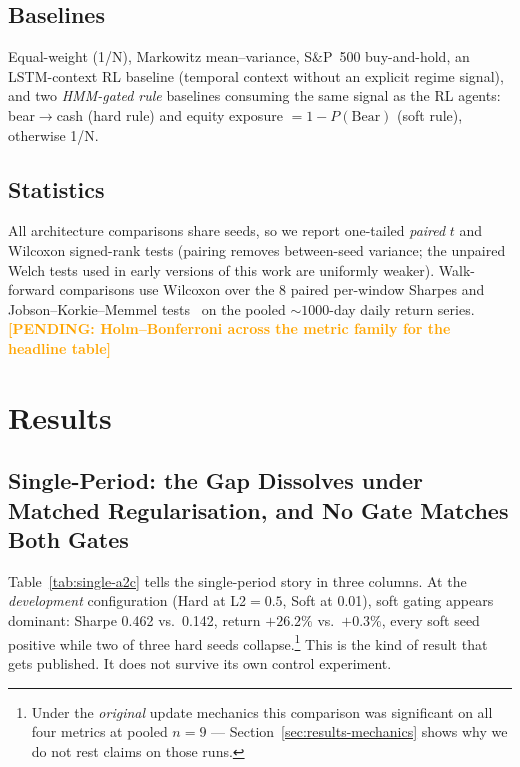 \documentclass[sigconf,anonymous,review]{acmart}
\newcommand{\pending}[1]{\textcolor{orange}{\textbf{[PENDING: #1]}}}
\begin{document}
\subsection{Baselines}
Equal-weight (1/N), Markowitz mean--variance, S\&P~500 buy-and-hold, an
LSTM-context RL baseline (temporal context without an explicit regime
signal), and two \emph{HMM-gated rule} baselines consuming the same
signal as the RL agents: bear$\rightarrow$cash (hard rule) and equity
exposure $=1-P(\mathrm{Bear})$ (soft rule), otherwise 1/N.

\subsection{Statistics}
All architecture comparisons share seeds, so we report one-tailed
\emph{paired} $t$ and Wilcoxon signed-rank tests (pairing removes
between-seed variance; the unpaired Welch tests used in early versions of
this work are uniformly weaker). Walk-forward comparisons use Wilcoxon
over the 8 paired per-window Sharpes and Jobson--Korkie--Memmel
tests~\cite{jobson1981,memmel2003} on the pooled ${\sim}1000$-day daily
return series. \pending{Holm--Bonferroni across the metric family for the
headline table}

\section{Results}

\subsection{Single-Period: the Gap Dissolves under Matched
Regularisation, and No Gate Matches Both Gates}
\label{sec:results-single}

Table~\ref{tab:single-a2c} tells the single-period story in three
columns. At the \emph{development} configuration (Hard at L2${=}0.5$,
Soft at 0.01), soft gating appears dominant: Sharpe 0.462 vs.\ 0.142,
return $+26.2\%$ vs.\ $+0.3\%$, every soft seed positive while two of
three hard seeds collapse.\footnote{Under the \emph{original} update
mechanics this comparison was significant on all four metrics at pooled
$n{=}9$ --- Section~\ref{sec:results-mechanics} shows why we do not rest
claims on those runs.} This is the kind of result that gets published.
It does not survive its own control experiment.
\end{document}
